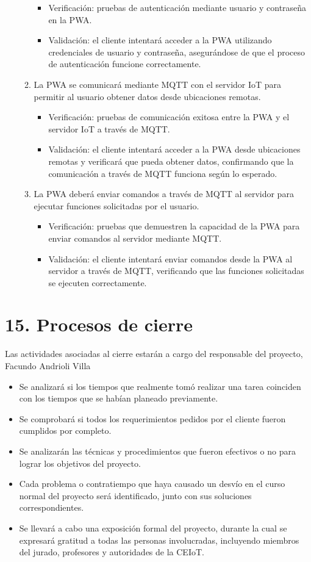 \documentclass[
11pt, %
]{charter}
\begin{document}
\begin{enumerate}
\begin{enumerate}
\begin{itemize}
				\item Verificación: pruebas de autenticación mediante usuario y contraseña en la PWA.
				\item Validación: el cliente intentará acceder a la PWA utilizando credenciales de usuario y contraseña, asegurándose de que el proceso de autenticación funcione correctamente.
			\end{itemize}
			\item  La PWA se comunicará mediante MQTT con el servidor IoT para permitir al usuario obtener datos desde ubicaciones remotas.
			\begin{itemize}
				\item Verificación: pruebas de comunicación exitosa entre la PWA y el servidor IoT a través de MQTT.
				\item Validación: el cliente intentará acceder a la PWA desde ubicaciones remotas y verificará que pueda obtener datos, confirmando que la comunicación a través de MQTT funciona según lo esperado.
			\end{itemize}
			\item La PWA deberá enviar comandos a través de MQTT al servidor  para ejecutar funciones solicitadas por el usuario.
			\begin{itemize}
				\item Verificación: pruebas que demuestren la capacidad de la PWA para enviar comandos al servidor mediante MQTT.
				\item Validación: el cliente intentará enviar comandos desde la PWA al servidor a través de MQTT, verificando que las funciones solicitadas se ejecuten correctamente.
			\end{itemize}
		\end{enumerate}
\end{enumerate}

\section{15. Procesos de cierre}    
\label{sec:cierre}

Las actividades asociadas al cierre estarán a cargo del responsable del proyecto, Facundo Andrioli Villa

\begin{itemize}
	\item Se analizará si los tiempos que realmente tomó realizar una tarea coinciden con los tiempos que se habían planeado previamente.
	\item Se comprobará si todos los requerimientos pedidos por el cliente fueron cumplidos por completo.
	\item Se analizarán las técnicas y procedimientos que fueron efectivos o no para lograr los objetivos del proyecto.
	\item Cada problema o contratiempo que haya causado un desvío en el curso normal del proyecto será identificado, junto con sus soluciones correspondientes.
	\item Se llevará a cabo una exposición formal del proyecto, durante la cual se expresará gratitud a todas las personas involucradas, incluyendo miembros del jurado, profesores y autoridades de la CEIoT.
\end{itemize}
\end{document}
